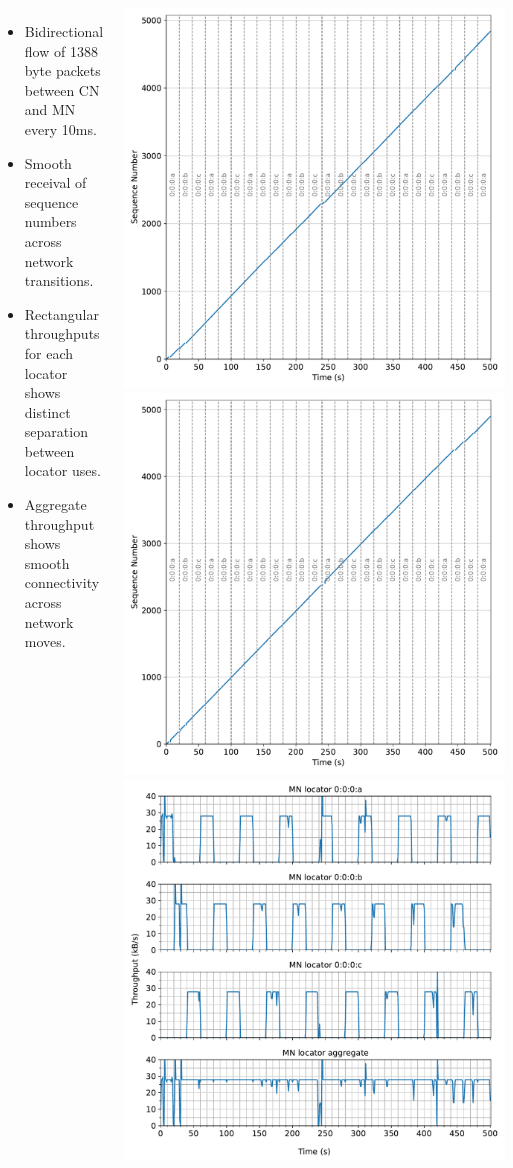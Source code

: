 \documentclass[25pt, a0paper, portrait]{tikzposter}
\begin{document}
\begin{columns}
{        \begin{itemize}
            \item Bidirectional flow of 1388 byte packets between CN and MN every 10ms.
            \item Smooth receival of sequence numbers across network transitions.
            \item Rectangular throughputs for each locator shows distinct separation between locator uses.
            \item Aggregate throughput shows smooth connectivity across network moves.
        \end{itemize}
    }
    
    {
        \includegraphics[width=0.5\linewidth]{systems_issues_graphs/exp3/Received sequence numbers vs Time on MN.pdf}
        \includegraphics[width=0.5\linewidth]{systems_issues_graphs/exp3/Received sequence numbers vs Time on CN.pdf}
        \includegraphics[width=0.5\linewidth]{systems_issues_graphs/exp3/Throughput in 1s buckets vs Time on CN.pdf}
}
\end{columns}
\end{document}
